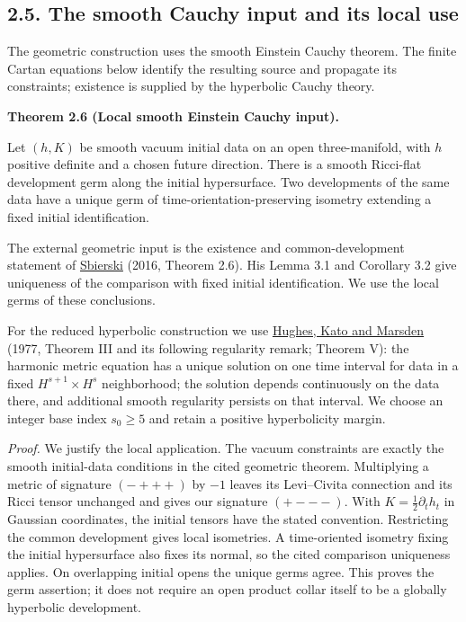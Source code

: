 \documentclass[
  english,
  11pt,
  reqno]{amsart}
\makeatletter
\newcommand{\pandocstatementheading}[1]{%
  \par\addpenalty{\@beginparpenalty}%
  \addvspace{.5\baselineskip plus .2\baselineskip minus .2\baselineskip}%
  {\normalfont\bfseries #1\par}%
  \nobreak\@afterindenttrue\@afterheading
}
\makeatother
\begin{document}
\subsection{2.5. The smooth Cauchy input and its local
use}\label{the-smooth-cauchy-input-and-its-local-use}\label{sec:online-smooth-cauchy-input}

The geometric construction uses the smooth Einstein Cauchy theorem. The
finite Cartan equations below identify the resulting source and
propagate its constraints; existence is supplied by the hyperbolic
Cauchy theory.

\pandocstatementheading{\leavevmode{}\label{thm:online-smooth-local-cauchy-input}Theorem 2.6 (Local smooth Einstein Cauchy input).}

Let \((h,K)\) be smooth vacuum initial data on an open three-manifold,
with \(h\) positive definite and a chosen future direction. There is a
smooth Ricci-flat development germ along the initial hypersurface. Two
developments of the same data have a unique germ of
time-orientation-preserving isometry extending a fixed initial
identification.

The external geometric input is the existence and common-development
statement of \hyperref[ref-Sbierski2016]{Sbierski} (2016, Theorem 2.6).
His Lemma 3.1 and Corollary 3.2 give uniqueness of the comparison with
fixed initial identification. We use the local germs of these
conclusions.

For the reduced hyperbolic construction we use
\hyperref[ref-HughesKatoMarsden1977]{Hughes, Kato and Marsden} (1977,
Theorem III and its following regularity remark; Theorem V): the
harmonic metric equation has a unique solution on one time interval for
data in a fixed \(H^{s+1}\times H^s\) neighborhood; the solution depends
continuously on the data there, and additional smooth regularity
persists on that interval. We choose an integer base index \(s_0\ge5\)
and retain a positive hyperbolicity margin.

\emph{Proof.} We justify the local application. The vacuum constraints
are exactly the smooth initial-data conditions in the cited geometric
theorem. Multiplying a metric of signature \((-+++)\) by \(-1\) leaves
its Levi--Civita connection and its Ricci tensor unchanged and gives our
signature \((+---)\). With \(K=\frac12\partial_t h_t\) in Gaussian
coordinates, the initial tensors have the stated convention. Restricting
the common development gives local isometries. A time-oriented isometry
fixing the initial hypersurface also fixes its normal, so the cited
comparison uniqueness applies. On overlapping initial opens the unique
germs agree. This proves the germ assertion; it does not require an open
product collar itself to be a globally hyperbolic development.
\end{document}
